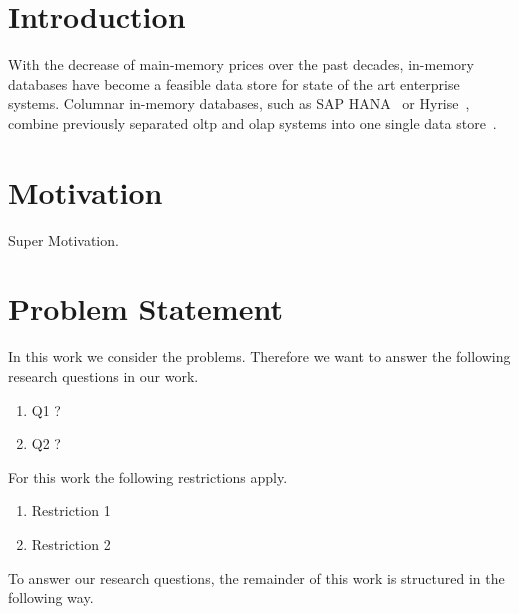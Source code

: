 \chapter{Introduction}
\label{chapter:introduction}

With the decrease of main-memory prices over the past decades, in-memory databases have become a feasible data store for state of the art enterprise systems.
Columnar in-memory databases, such as SAP HANA~\cite{Farber:2012:SHD:2094114.2094126} or Hyrise~\cite{grund2010hyrise}, combine previously separated \gls{oltp} and \gls{olap} systems into one single data store~\cite{Plattner:2009:CDA:1559845.1559846}.

\chapter{Motivation}
\label{chapter:Motivation}

Super Motivation.
\chapter{Problem Statement}
\label{chapter:problemStatement}

In this work we consider the problems.
Therefore we want to answer the following research questions in our work.
\begin{enumerate}
\item Q1 ?
\item Q2 ?
\end{enumerate}

For this work the following restrictions apply.
\begin{enumerate}
	\item Restriction 1
	\item Restriction 2
\end{enumerate}

To answer our research questions, the remainder of this work is structured in the following way.